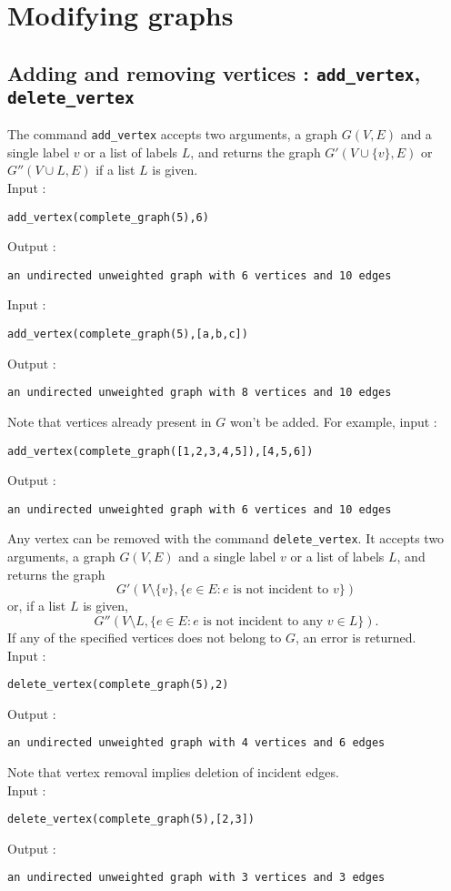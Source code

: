 \documentclass[a4paper,11pt]{article}
\begin{document}
\section{Modifying graphs}

\subsection{Adding and removing vertices : {\tt add\_vertex}, {\tt delete\_vertex}}
The command {\tt add\_vertex} accepts two arguments, a graph $ G(V,E) $ and a single label $ v $ or a list of labels $ L $, and returns the graph $ G'(V\cup\{v\},E) $ or $ G''(V\cup L,E) $ if a list $ L $ is given.\\
Input :
\begin{center}
  \tt add\_vertex(complete\_graph(5),6)
\end{center}
Output :
\begin{center}
  \tt an undirected unweighted graph with 6 vertices and 10 edges
\end{center}
Input :
\begin{center}
  \tt add\_vertex(complete\_graph(5),[a,b,c])
\end{center}
Output :
\begin{center}
  \tt an undirected unweighted graph with 8 vertices and 10 edges
\end{center}
Note that vertices already present in $ G $ won't be added. For example, input :
\begin{center}
  \tt add\_vertex(complete\_graph([1,2,3,4,5]),[4,5,6])
\end{center}
Output :
\begin{center}
  \tt an undirected unweighted graph with 6 vertices and 10 edges
\end{center}

Any vertex can be removed with the command {\tt delete\_vertex}. It accepts two arguments, a graph $ G(V,E) $ and a single label $ v $ or a list of labels $ L $, and returns the graph \[ G'(V\setminus\{v\},\{e\in E:e \text{ is not incident to } v\}) \] or, if a list $ L $ is given, \[ G''(V\setminus L,\{e\in E:e \text{ is not incident to any } v\in L\}). \]
If any of the specified vertices does not belong to $ G $, an error is returned.\\
Input :
\begin{center}
  \tt delete\_vertex(complete\_graph(5),2)
\end{center}
Output :
\begin{center}
  \tt an undirected unweighted graph with 4 vertices and 6 edges
\end{center}
Note that vertex removal implies deletion of incident edges.\\
Input :
\begin{center}
  \tt delete\_vertex(complete\_graph(5),[2,3])
\end{center}
Output :
\begin{center}
  \tt an undirected unweighted graph with 3 vertices and 3 edges
\end{center}
\end{document}
